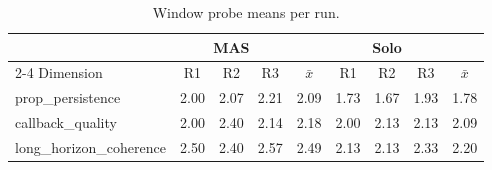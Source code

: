 \begin{table}[t]
\centering
\caption{Window probe means per run.}
\label{tab:window-detail}
\small
\begin{tabular}{@{}lcccccccc@{}}
\toprule
 & \multicolumn{3}{c}{MAS} & & \multicolumn{3}{c}{Solo} & \\
\cmidrule{2-4} \cmidrule{6-8}
Dimension & R1 & R2 & R3 & $\bar{x}$ & R1 & R2 & R3 & $\bar{x}$ \\
\midrule
prop\_persistence & 2.00 & 2.07 & 2.21 & 2.09 & 1.73 & 1.67 & 1.93 & 1.78 \\
callback\_quality & 2.00 & 2.40 & 2.14 & 2.18 & 2.00 & 2.13 & 2.13 & 2.09 \\
long\_horizon\_coherence & 2.50 & 2.40 & 2.57 & 2.49 & 2.13 & 2.13 & 2.33 & 2.20 \\
\bottomrule
\end{tabular}
\end{table}
